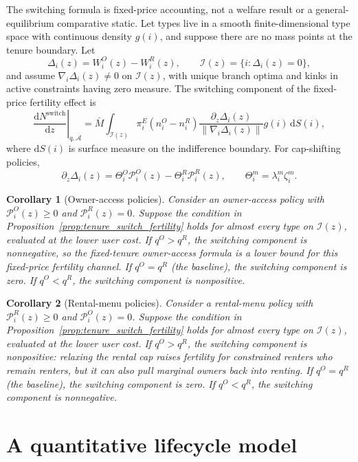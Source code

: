 \documentclass[11pt]{article}
\newtheorem{corollary}{Corollary}
\newcommand{\dd}{\mathrm d}
\newcommand{\1}{\mathbf 1}
\begin{document}
The switching formula is fixed-price accounting, not a welfare result or a general-equilibrium comparative static. Let types live in a smooth finite-dimensional type space with continuous density $g(i)$, and suppose there are no mass points at the tenure boundary. Let
\[
\Delta_i(z)=W_i^O(z)-W_i^R(z),
\qquad
\mathcal I(z)=\{i:\Delta_i(z)=0\},
\]
and assume $\nabla_i\Delta_i(z)\ne0$ on $\mathcal I(z)$, with unique branch optima and kinks in active constraints having zero measure. The switching component of the fixed-price fertility effect is
\[
\left.\frac{\dd N^{\mathrm{switch}}}{\dd z}\right|_{q,\mathcal A}
=
\bar M
\int_{\mathcal I(z)}
\pi_i^E
\left(n_i^O-n_i^R\right)
\frac{\partial_z\Delta_i(z)}
{\|\nabla_i\Delta_i(z)\|}
g(i)\,\dd S(i),
\]
where $\dd S(i)$ is surface measure on the indifference boundary. For cap-shifting policies,
\[
\partial_z\Delta_i(z)
=
\Theta_i^O \mathcal P_i^O(z)-\Theta_i^R \mathcal P_i^R(z),
\qquad
\Theta_i^m=\lambda_i^m\zeta_i^m.
\]

\begin{corollary}[Owner-access policies]
\label{cor:switch_owner_access}
Consider an owner-access policy with $\mathcal P_i^O(z)\ge0$ and $\mathcal P_i^R(z)=0$. Suppose the condition in Proposition~\ref{prop:tenure_switch_fertility} holds for almost every type on $\mathcal I(z)$, evaluated at the lower user cost. If $q^O>q^R$, the switching component is nonnegative, so the fixed-tenure owner-access formula is a lower bound for this fixed-price fertility channel. If $q^O=q^R$ (the baseline), the switching component is zero. If $q^O<q^R$, the switching component is nonpositive.
\end{corollary}

\begin{corollary}[Rental-menu policies]
\label{cor:switch_rental_menu}
Consider a rental-menu policy with $\mathcal P_i^R(z)\ge0$ and $\mathcal P_i^O(z)=0$. Suppose the condition in Proposition~\ref{prop:tenure_switch_fertility} holds for almost every type on $\mathcal I(z)$, evaluated at the lower user cost. If $q^O>q^R$, the switching component is nonpositive: relaxing the rental cap raises fertility for constrained renters who remain renters, but it can also pull marginal owners back into renting. If $q^O=q^R$ (the baseline), the switching component is zero. If $q^O<q^R$, the switching component is nonnegative.
\end{corollary}

\section{A quantitative lifecycle model}
\label{sec:quant}
\end{document}
